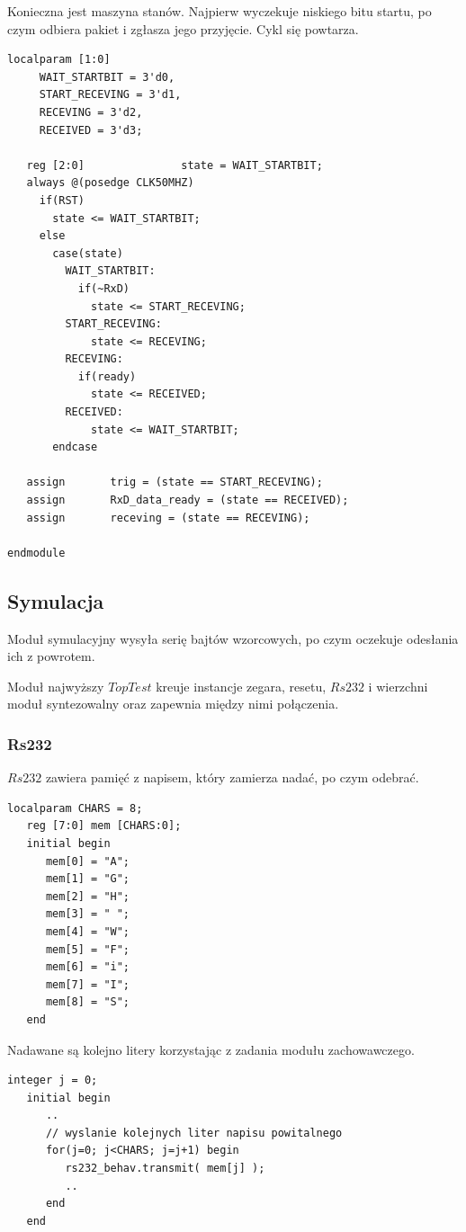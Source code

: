\documentclass[a4paper,12pt]{article}
\begin{document}
Konieczna jest maszyna stanów. Najpierw wyczekuje niskiego bitu startu, po czym odbiera pakiet i zgłasza jego przyjęcie. Cykl się powtarza.
\begin{lstlisting}[label=Rs232Rx,caption=Rs232Rx.v,firstnumber=79]
   localparam [1:0]
     WAIT_STARTBIT = 3'd0,
     START_RECEVING = 3'd1,
     RECEVING = 3'd2,
     RECEIVED = 3'd3;

   reg [2:0]               state = WAIT_STARTBIT;
   always @(posedge CLK50MHZ)
     if(RST)
       state <= WAIT_STARTBIT;
     else
       case(state)
         WAIT_STARTBIT:
           if(~RxD)
             state <= START_RECEVING;
         START_RECEVING:
             state <= RECEVING;
         RECEVING:
           if(ready)
             state <= RECEIVED;
         RECEIVED:
             state <= WAIT_STARTBIT;
       endcase

   assign       trig = (state == START_RECEVING);
   assign       RxD_data_ready = (state == RECEIVED);
   assign       receving = (state == RECEVING);

endmodule
\end{lstlisting}

\subsection{Symulacja}

Moduł symulacyjny wysyła serię bajtów wzorcowych, po czym oczekuje odesłania ich z powrotem.

Moduł najwyższy $TopTest$ kreuje instancje zegara, resetu, $Rs232$ i wierzchni moduł syntezowalny oraz zapewnia między nimi połączenia.


\subsubsection{Rs232}


$Rs232$ zawiera pamięć z napisem, który zamierza nadać, po czym odebrać.
\begin{lstlisting}[label=sim/Rs232,caption=sim/Rs232.v,firstnumber=28]
   localparam CHARS = 8;
   reg [7:0] mem [CHARS:0];
   initial begin
      mem[0] = "A";
      mem[1] = "G";
      mem[2] = "H";
      mem[3] = " ";
      mem[4] = "W";
      mem[5] = "F";
      mem[6] = "i";
      mem[7] = "I";
      mem[8] = "S";
   end
\end{lstlisting}

Nadawane są kolejno litery korzystając z zadania modułu zachowawczego.
\begin{lstlisting}[label=sim/Rs232,caption=sim/Rs232.v,firstnumber=42]
   integer j = 0;
   initial begin
      ..
      // wyslanie kolejnych liter napisu powitalnego
      for(j=0; j<CHARS; j=j+1) begin
         rs232_behav.transmit( mem[j] );
         ..
      end
   end
\end{lstlisting}
\end{document}
